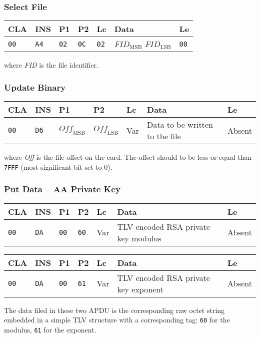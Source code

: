 \documentclass{article}
\begin{document}
\subsubsection{Select File}

\begin{flushleft}
\begin{tabular}{|l|l|l|l|l|l|l|}
\hline
CLA & INS & P1 & P2 & Lc & Data & Le \\
\hline
\texttt{00} & \texttt{A4} & \texttt{02} & \texttt{0C} & \texttt{02} &
$\mathit{FID}_{\mathrm{MSB}}$ $\mathit{FID}_{\mathrm{LSB}}$ & \texttt{00} \\
\hline
\end{tabular}
\end{flushleft}
where \textit{FID} is the file identifier.

\subsubsection{Update Binary}

\begin{flushleft}
\begin{tabular}{|l|l|l|l|l|l|l|}
\hline
CLA & INS & P1 & P2 & Lc & Data & Le \\
\hline
\texttt{00} & \texttt{D6} &
$\mathit{Off}_{\mathrm{MSB}}$ & $\mathit{Off}_{\mathrm{LSB}}$ &
Var & Data to be written to the file & Absent \\
\hline
\end{tabular}
\end{flushleft}
where \textit{Off} is the file offset on the card. The offset should
to be less or equal than \texttt{7FFF} (most significant bit set to
0).

\subsubsection{Put Data -- AA Private Key}

\begin{flushleft}
\begin{tabular}{|l|l|l|l|l|l|l|}
\hline
CLA & INS & P1 & P2 & Lc & Data & Le \\
\hline
\texttt{00} & \texttt{DA} & \texttt{00} & \texttt{60} &
Var & TLV encoded RSA private key modulus & Absent \\
\hline
\end{tabular}

\medskip

\begin{tabular}{|l|l|l|l|l|l|l|}
\hline
CLA & INS & P1 & P2 & Lc & Data & Le \\
\hline
\texttt{00} & \texttt{DA} & \texttt{00} & \texttt{61} &
Var & TLV encoded RSA private key exponent & Absent \\
\hline
\end{tabular}
\end{flushleft}
The data filed in these two APDU is the corresponding raw octet string
embedded in a simple TLV structure with a corresponding tag:
\texttt{60} for the modulus, \texttt{61} for the exponent.
\end{document}
